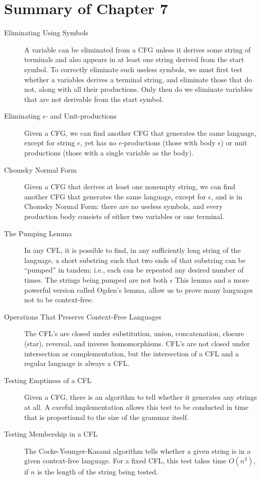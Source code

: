 \documentclass[]{article}
\begin{document}
\section*{Summary of Chapter 7}
  \begin{description}
    \item[Eliminating Using Symbols] A variable can be eliminated from a CFG
    unless it derives some string of terminals and also appears in at least one
    string derived from the start symbol. To correctly eliminate such useless
    symbols, we must first test whether a variables derives a terminal string,
    and eliminate those that do not, along with all their productions. Only then
    do we eliminate variables that are not derivable from the start symbol.
    \item[Eliminating $\epsilon$- and Unit-productions] Given a CFG, we can find
    another CFG that generates the same language, except for string $\epsilon$,
    yet has no $\epsilon$-productions (those with body $\epsilon$) or unit
    productions (those with a single variable as the body).
    \item[Chomsky Normal Form] Given a CFG that derives at least one nonempty
    string, we can find another CFG that generates the same language, except for
    $\epsilon$, and is in Chomsky Normal Form: there are no useless symbols, and
    every production body consists of either two variables or one terminal.
    \item[The Pumping Lemma] In any CFL, it is possible to find, in any
    sufficiently long string of the language, a short substring such that two
    ends of that substring can be ``pumped'' in tandem; i.e., each can be
    repeated any desired number of times. The strings being pumped are not both
    $\epsilon$ This lemma and a more powerful version called Ogden's lemma,
    allow us to prove many languages not to be context-free.
    \item[Operations That Preserve Context-Free Languages] The CFL's are closed
    under substitution, union, concatenation, closure (star), reversal, and
    inverse homomorphisms. CFL's are not closed under intersection or
    complementation, but the intersection of a CFL and a regular language is
    always a CFL.
    \item[Testing Emptiness of a CFL] Given a CFG, there is an algorithm to tell
    whether it generates any strings at all. A careful implementation allows
    this test to be conducted in time that is proportional to the size of the
    grammar itself.
    \item[Testing Membership in a CFL] The Cocke-Younger-Kasami algorithm tells
    whether a given string is in a given context-free language. For a fixed CFL,
    this test takes time $O(n^3)$, if $n$ is the length of the string being
    tested.
  \end{description}
\end{document}
